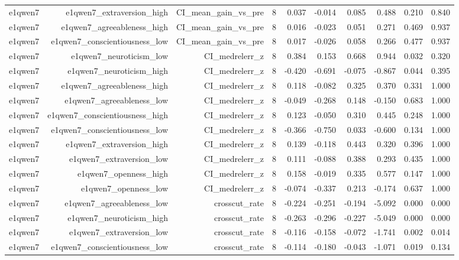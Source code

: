 \documentclass[11pt]{article}
\begin{document}
\begin{landscape}
\begin{longtable}{@{}lrrrrrrrrr@{}}
e1qwen7 & e1qwen7\_extraversion\_high & CI\_mean\_gain\_vs\_pre & 8 & 0.037 & -0.014 & 0.085 & 0.488 & 0.210 & 0.840 \\
e1qwen7 & e1qwen7\_agreeableness\_high & CI\_mean\_gain\_vs\_pre & 8 & 0.016 & -0.023 & 0.051 & 0.271 & 0.469 & 0.937 \\
e1qwen7 & e1qwen7\_conscientiousness\_low & CI\_mean\_gain\_vs\_pre & 8 & 0.017 & -0.026 & 0.058 & 0.266 & 0.477 & 0.937 \\
e1qwen7 & e1qwen7\_neuroticism\_low & CI\_medrelerr\_z & 8 & 0.384 & 0.153 & 0.668 & 0.944 & 0.032 & 0.320 \\
e1qwen7 & e1qwen7\_neuroticism\_high & CI\_medrelerr\_z & 8 & -0.420 & -0.691 & -0.075 & -0.867 & 0.044 & 0.395 \\
e1qwen7 & e1qwen7\_agreeableness\_high & CI\_medrelerr\_z & 8 & 0.118 & -0.082 & 0.325 & 0.370 & 0.331 & 1.000 \\
e1qwen7 & e1qwen7\_agreeableness\_low & CI\_medrelerr\_z & 8 & -0.049 & -0.268 & 0.148 & -0.150 & 0.683 & 1.000 \\
e1qwen7 & e1qwen7\_conscientiousness\_high & CI\_medrelerr\_z & 8 & 0.123 & -0.050 & 0.310 & 0.445 & 0.248 & 1.000 \\
e1qwen7 & e1qwen7\_conscientiousness\_low & CI\_medrelerr\_z & 8 & -0.366 & -0.750 & 0.033 & -0.600 & 0.134 & 1.000 \\
e1qwen7 & e1qwen7\_extraversion\_high & CI\_medrelerr\_z & 8 & 0.139 & -0.118 & 0.443 & 0.320 & 0.396 & 1.000 \\
e1qwen7 & e1qwen7\_extraversion\_low & CI\_medrelerr\_z & 8 & 0.111 & -0.088 & 0.388 & 0.293 & 0.435 & 1.000 \\
e1qwen7 & e1qwen7\_openness\_high & CI\_medrelerr\_z & 8 & 0.158 & -0.019 & 0.335 & 0.577 & 0.147 & 1.000 \\
e1qwen7 & e1qwen7\_openness\_low & CI\_medrelerr\_z & 8 & -0.074 & -0.337 & 0.213 & -0.174 & 0.637 & 1.000 \\
e1qwen7 & e1qwen7\_agreeableness\_low & crosscut\_rate & 8 & -0.224 & -0.251 & -0.194 & -5.092 & 0.000 & 0.000 \\
e1qwen7 & e1qwen7\_neuroticism\_high & crosscut\_rate & 8 & -0.263 & -0.296 & -0.227 & -5.049 & 0.000 & 0.000 \\
e1qwen7 & e1qwen7\_extraversion\_low & crosscut\_rate & 8 & -0.116 & -0.158 & -0.072 & -1.741 & 0.002 & 0.014 \\
e1qwen7 & e1qwen7\_conscientiousness\_low & crosscut\_rate & 8 & -0.114 & -0.180 & -0.043 & -1.071 & 0.019 & 0.134 \\

\end{longtable}
\end{landscape}
\end{document}
